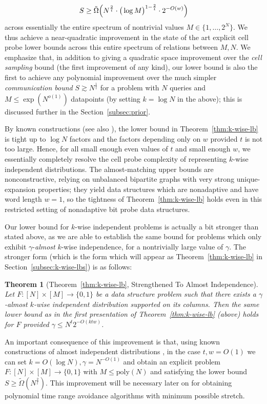 \documentclass[11pt]{article}
\newtheorem*{theorem*}{Theorem}
\newcommand{\B}{\{0,1\}}
\newcommand{\poly}{\mathrm{poly}}
\begin{document}
\[
S \geq \tilde{\Omega}\Bigl( N^{\frac{2}{t}} \cdot \big(\log M\big)^{1 - \frac{2}{t}} \cdot 2^{-O(w)}\Bigr)
\]
across essentially the entire spectrum of nontrivial values $M \in \{1,\ldots,2^N\}$. We thus achieve a near-quadratic improvement in the state of the art explicit cell probe lower bounds across this entire spectrum of relations between $M,N$. 
We emphasize that, in addition to giving a quadratic space improvement over the \emph{cell sampling} bound (the first improvement of any kind), our lower bound is also the first to achieve any polynomial improvement over the much simpler \emph{communication bound} $S \gtrsim N^{\frac{1}{t}}$ for a problem with $N$ queries and $M \leq \exp(N^{o(1)})$ datapoints (by setting $k=\log N$ in the above); this is discussed further in the Section~\ref{subsec:prior}. 

By known constructions \cite{Siegel89,Siegel04} (see also \cite{pudlak}), the lower bound in Theorem~\ref{thm:k-wise-lb} is tight up to $\log N$ factors and the factors depending only on $w$ provided $t$ is not too large. Hence, for all small enough even values of $t$ and small enough $w$, we essentially completely resolve the cell probe complexity of representing $k$-wise independent distributions. The almost-matching upper bounds are nonconstructive, relying on unbalanced bipartite graphs with very strong unique-expansion properties; they yield data structures which are nonadaptive and have word length $w=1$, so the tightness of Theorem~\ref{thm:k-wise-lb} holds even in this restricted setting of nonadaptive bit probe data structures.

Our lower bound for $k$-wise independent problems is actually a bit stronger than stated above, as we are able to establish the same bound for problems which only exhibit $\gamma$-\emph{almost} $k$-wise independence, for a nontrivially large value of $\gamma$. The stronger form (which is the form which will appear as Theorem~\ref{thm:k-wise-lb} in Section~\ref{subsec:k-wise-lbs}) is as follows:
\begin{theorem*}[Theorem~\ref{thm:k-wise-lb}, Strengthened To Almost Independence]
Let $F: [N] \times [M] \to \B$ be a data structure problem such that there exists a $\gamma$-almost $k$-wise independent distribution supported on its columns. 
Then the same lower bound as in the first presentation of Theorem~\ref{thm:k-wise-lb} (above) holds for $F$ provided $\gamma \leq  N^{t} 2^{-O(ktw)}$.
\end{theorem*}
An important consequence of this improvement is that, using known constructions of almost independent distributions \cite{naornaor}, in the case $t,w=O(1)$ we can set $k= O(\log N), \gamma = N^{-O(1)}$ and obtain an explicit problem $F: [N] \times [M] \to \B$ with $M \leq \poly(N)$ and satisfying the lower bound $S \geq \tilde{\Omega}(N^{\frac{2}{t}})$.
This improvement will be necessary later on for obtaining polynomial time range avoidance algorithms with minimum possible stretch. 
\end{document}
